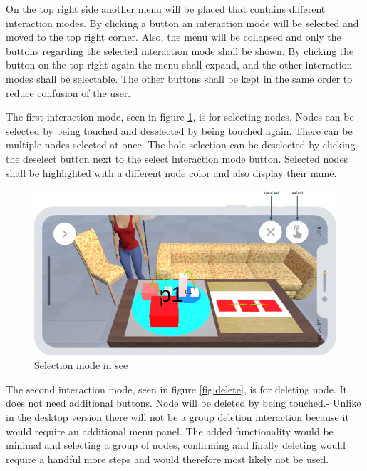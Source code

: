 On the top right side another menu will be placed that contains different interaction modes.
By clicking a button an interaction mode will be selected and moved to the top right corner.
Also, the menu will be collapsed and only the buttons regarding the selected interaction mode shall be shown.
By clicking the button on the top right again the menu shall expand, and the other interaction modes shall be selectable.
The other buttons shall be kept in the same order to reduce confusion of the user.

The first interaction mode, seen in figure \ref{fig:select}, is for selecting nodes.
Nodes can be selected by being touched and deselected by being touched again.
There can be multiple nodes selected at once.
The hole selection can be deselected by clicking the deselect button next to the select interaction mode button.
Selected nodes shall be highlighted with a different node color and also display their name.

\begin{figure}[htb]
    \centering
    \includegraphics[width=1\textwidth]{Concept/img/menu1.png}
    \caption{Selection mode in \gls{see}}\label{fig:select}
\end{figure}

The second interaction mode, seen in figure \ref{fig:delete}, is for deleting node.
It does not need additional buttons.
Node will be deleted by being touched.-
Unlike in the desktop version there will not be a group deletion interaction because it would require an additional menu panel.
The added functionality would be minimal and selecting a group of nodes, confirming and finally deleting would require a handful more steps and would therefore most likely not be used.

